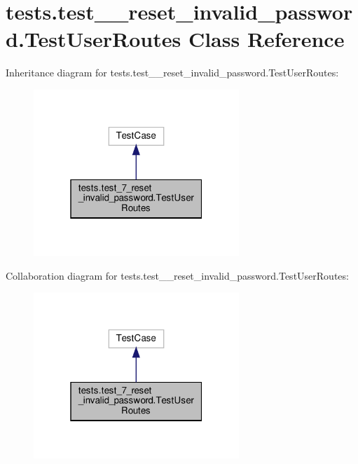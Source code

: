 \hypertarget{classtests_1_1test__7__reset__invalid__password_1_1_test_user_routes}{}\section{tests.\+test\+\_\+\_\+reset\+\_\+invalid\+\_\+password.\+Test\+User\+Routes Class Reference}
\label{classtests_1_1test__7__reset__invalid__password_1_1_test_user_routes}


Inheritance diagram for tests.\+test\+\_\+\_\+reset\+\_\+invalid\+\_\+password.\+Test\+User\+Routes\+:\nopagebreak
\begin{figure}[H]
\begin{center}
\leavevmode
\includegraphics[width=220pt]{classtests_1_1test__7__reset__invalid__password_1_1_test_user_routes__inherit__graph}
\end{center}
\end{figure}


Collaboration diagram for tests.\+test\+\_\+\_\+reset\+\_\+invalid\+\_\+password.\+Test\+User\+Routes\+:\nopagebreak
\begin{figure}[H]
\begin{center}
\leavevmode
\includegraphics[width=220pt]{classtests_1_1test__7__reset__invalid__password_1_1_test_user_routes__coll__graph}
\end{center}
\end{figure}

